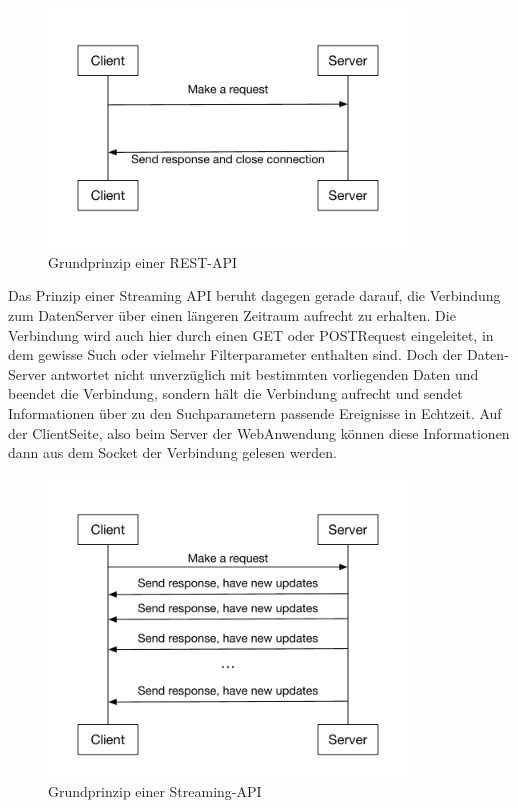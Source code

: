 \begin{figure}[!h]
    \centering
    \includegraphics[width=0.85\textwidth]{Graphics/normal_rest_api}
    \caption{Grundprinzip einer REST-API}
   \label{fig:restapi}
\end{figure}
\newpage
Das Prinzip einer Streaming API beruht dagegen gerade darauf, die Verbindung zum Daten­Server
über einen längeren Zeitraum aufrecht zu erhalten. Die Verbindung wird auch hier durch einen
GET­ oder POST­Request eingeleitet, in dem gewisse Such­ oder vielmehr Filterparameter
enthalten sind. Doch der Daten­Server antwortet nicht unverzüglich mit bestimmten vorliegenden
Daten und beendet die Verbindung, sondern hält die Verbindung aufrecht und sendet
Informationen über zu den Suchparametern passende Ereignisse in Echtzeit. Auf der Client­Seite,
also beim Server der Web­Anwendung können diese Informationen dann aus dem Socket der
Verbindung gelesen werden. \\

\begin{figure}[!h]
    \centering
    \includegraphics[width=0.85\textwidth]{Graphics/streaming_api}
    \caption{Grundprinzip einer Streaming-API}
   \label{fig:streamapi}
\end{figure}

